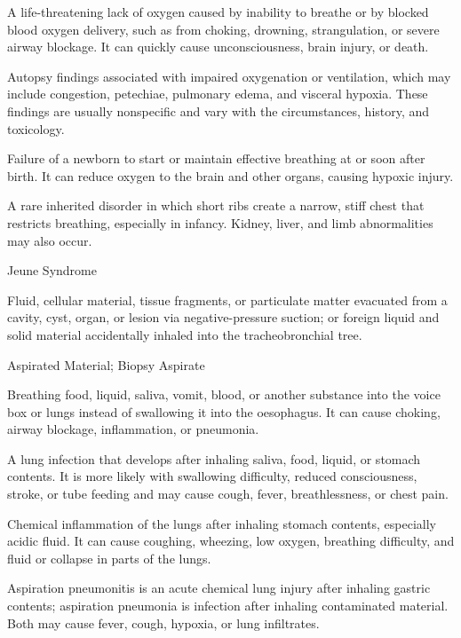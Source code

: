  A life-threatening lack of oxygen caused by inability to breathe or by blocked blood oxygen delivery, such as from choking, drowning, strangulation, or severe airway blockage. It can quickly cause unconsciousness, brain injury, or death.

 Autopsy findings associated with impaired oxygenation or ventilation, which may include congestion, petechiae, pulmonary edema, and visceral hypoxia. These findings are usually nonspecific and vary with the circumstances, history, and toxicology.

 Failure of a newborn to start or maintain effective breathing at or soon after birth. It can reduce oxygen to the brain and other organs, causing hypoxic injury.

 A rare inherited disorder in which short ribs create a narrow, stiff chest that restricts breathing, especially in infancy. Kidney, liver, and limb abnormalities may also occur.

\synonyms
Jeune Syndrome

 Fluid, cellular material, tissue fragments, or particulate matter evacuated from a cavity, cyst, organ, or lesion via negative-pressure suction; or foreign liquid and solid material accidentally inhaled into the tracheobronchial tree.

\synonyms
Aspirated Material; Biopsy Aspirate

 Breathing food, liquid, saliva, vomit, blood, or another substance into the voice box or lungs instead of swallowing it into the oesophagus. It can cause choking, airway blockage, inflammation, or pneumonia.

 A lung infection that develops after inhaling saliva, food, liquid, or stomach contents. It is more likely with swallowing difficulty, reduced consciousness, stroke, or tube feeding and may cause cough, fever, breathlessness, or chest pain.

 Chemical inflammation of the lungs after inhaling stomach contents, especially acidic fluid. It can cause coughing, wheezing, low oxygen, breathing difficulty, and fluid or collapse in parts of the lungs.

 Aspiration pneumonitis is an acute chemical lung injury after inhaling gastric contents; aspiration pneumonia is infection after inhaling contaminated material. Both may cause fever, cough, hypoxia, or lung infiltrates.

